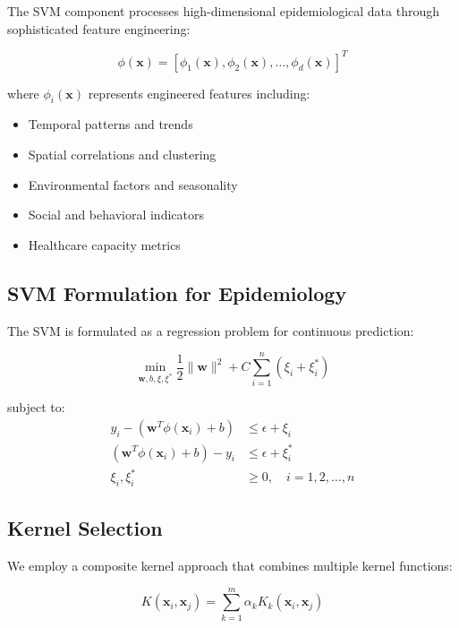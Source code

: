 \documentclass[12pt,a4paper]{report}
\begin{document}
The SVM component processes high-dimensional epidemiological data through sophisticated feature engineering:

\begin{equation}
\phi(\mathbf{x}) = [\phi_1(\mathbf{x}), \phi_2(\mathbf{x}), \ldots, \phi_d(\mathbf{x})]^T
\end{equation}

where $\phi_i(\mathbf{x})$ represents engineered features including:
\begin{itemize}
    \item Temporal patterns and trends
    \item Spatial correlations and clustering
    \item Environmental factors and seasonality
    \item Social and behavioral indicators
    \item Healthcare capacity metrics
\end{itemize}

\subsection{SVM Formulation for Epidemiology}

The SVM is formulated as a regression problem for continuous prediction:

\begin{equation}
\min_{\mathbf{w}, b, \xi, \xi^*} \frac{1}{2}\|\mathbf{w}\|^2 + C\sum_{i=1}^{n}(\xi_i + \xi_i^*)
\end{equation}

subject to:
\begin{align}
y_i - (\mathbf{w}^T\phi(\mathbf{x}_i) + b) &\leq \epsilon + \xi_i \\
(\mathbf{w}^T\phi(\mathbf{x}_i) + b) - y_i &\leq \epsilon + \xi_i^* \\
\xi_i, \xi_i^* &\geq 0, \quad i = 1, 2, \ldots, n
\end{align}

\subsection{Kernel Selection}

We employ a composite kernel approach that combines multiple kernel functions:

\begin{equation}
K(\mathbf{x}_i, \mathbf{x}_j) = \sum_{k=1}^{m} \alpha_k K_k(\mathbf{x}_i, \mathbf{x}_j)
\end{equation}
\end{document}
